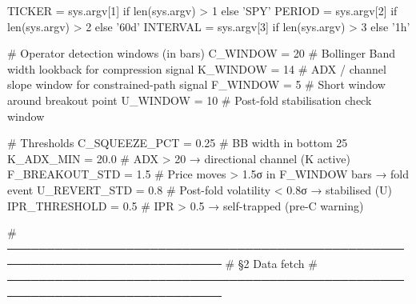 TICKER   = sys.argv[1] if len(sys.argv) > 1 else 'SPY'
PERIOD   = sys.argv[2] if len(sys.argv) > 2 else '60d'
INTERVAL = sys.argv[3] if len(sys.argv) > 3 else '1h'

# Operator detection windows (in bars)
C_WINDOW  = 20    # Bollinger Band width lookback for compression signal
K_WINDOW  = 14    # ADX / channel slope window for constrained-path signal
F_WINDOW  = 5     # Short window around breakout point
U_WINDOW  = 10    # Post-fold stabilisation check window

# Thresholds
C_SQUEEZE_PCT  = 0.25   # BB width in bottom 25%
K_ADX_MIN      = 20.0   # ADX > 20 → directional channel (K active)
F_BREAKOUT_STD = 1.5    # Price moves > 1.5σ in F_WINDOW bars → fold event
U_REVERT_STD   = 0.8    # Post-fold volatility < 0.8σ → stabilised (U)
IPR_THRESHOLD  = 0.5    # IPR > 0.5 → self-trapped (pre-C warning)

# ─────────────────────────────────────────────────────────────────────────────
# §2  Data fetch
# ─────────────────────────────────────────────────────────────────────────────

